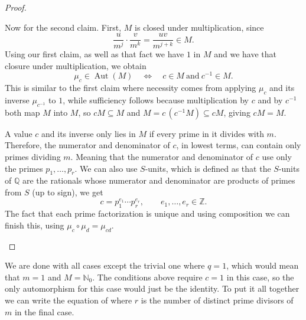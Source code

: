 \documentclass[11pt]{scrartcl}
\begin{document}
\begin{soln}
\begin{proof}
                \begin{subproof}
			Now for the second claim.  First, $M$ is closed under
			multiplication, since
			\[
			\frac{u}{m^j}\cdot\frac{v}{m^k}=\frac{uv}{m^{j+k}}\in M.
			\]
			Using our first claim, as well as that fact we have 
            $1$ in $M$ and we have that closure 
            under multiplication, we obtain 
             \[
            \mu_c\in\operatorname{Aut}(M)
            \quad\Longleftrightarrow\quad
            c\in M\ \text{and}\ c^{-1}\in M.
            \]
            This is similar to the first claim where  necessity
			comes from applying $\mu_c$ and its
            inverse $\mu_{c^{-1}}$ to $1$, while sufficiency follows because
            multiplication by $c$ and by $c^{-1}$ both map $M$ into $M$, so
            $cM\subseteq M$ and $M=c\,(c^{-1}M)\subseteq cM$, giving $cM=M$.


			A value $c$ and its inverse only lies in $M$ if every prime in it divides 
			with $m$. Therefore, the numerator and denominator of $c$, in lowest terms, can contain only primes dividing $m$. 
            Meaning that the numerator and denominator of $c$ use only the primes
            $p_1,\ldots,p_r$. We can also use $S$-units, which 
            is defined as that the
            $S$-units of $\mathbb Q$ are the rationals whose numerator and denominator
            are products of primes from $S$ (up to sign), we get
            \[
            c=p_1^{e_1}\cdots p_r^{e_r},
            \qquad e_1,\ldots,e_r\in\mathbb Z.
            \]
			The fact that each prime factorization is unique and using composition
            we can finish this, using 
            $\mu_c\circ\mu_d=\mu_{cd}$.
        \end{subproof}
    \end{proof}

	We are done with all cases except the trivial one 
	where $q=1$, which would mean that $m=1$ and $M=\mathbb N_0$.
	The conditions above require $c=1$ in this case, so the only automorphism
	for this case would just be the identity.
	To put it all together we can write the equation of
    where $r$ is the number of distinct prime divisors of $m$ in
    the final case.
\end{soln}
\end{document}
